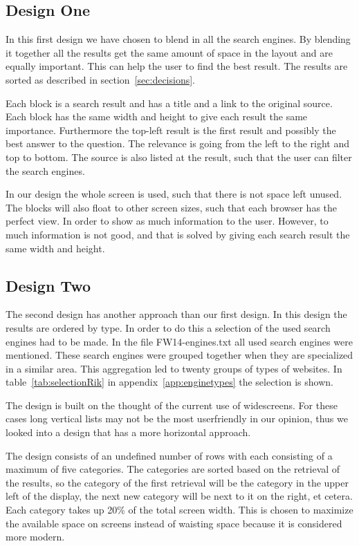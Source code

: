 \documentclass[12pt]{article}
\begin{document}
\subsection{Design One}
\label{sec:layoutHan}
In this first design we have chosen to blend in all the search engines. By blending it together all the results get the same amount of space in the layout and are equally important. This can help the user to find the best result. The results are sorted as described in section~\ref{sec:decisions}. 

Each block is a search result and has a title and a link to the original source. Each block has the same width and height to give each result the same importance. Furthermore the top-left result is the first result and possibly the best answer to the question. The relevance is going from the left to the right and top to bottom. The source is also listed at the result, such that the user can filter the search engines. 

In our design the whole screen is used, such that there is not space left unused. The blocks will also float to other screen sizes, such that each browser has the perfect view. In order to show as much information to the user. However, to much information is not good, and that is solved by giving each search result the same width and height. 

\subsection{Design Two}
\label{sec:layoutRik}
The second design has another approach than our first design.
In this design the results are ordered by type.
In order to do this a selection of the used search engines had to be made.
In the file FW14-engines.txt all used search engines were mentioned.
These search engines were grouped together when they are specialized in a similar area.
This aggregation led to twenty groups of types of websites.
In table~\ref{tab:selectionRik} in appendix~\ref{app:enginetypes} the selection is shown.

The design is built on the thought of the current use of widescreens.
For these cases long vertical lists may not be the most userfriendly in our opinion, thus we looked into a design that has a more horizontal approach.

The design consists of an undefined number of rows with each consisting of a maximum of five categories.
The categories are sorted based on the retrieval of the results, so the category of the first retrieval will be the category in the upper left of the display, the next new category will be next to it on the right, et cetera.
Each category takes up 20\% of the total screen width.
This is chosen to maximize the available space on screens instead of waisting space because it is considered more modern.
\end{document}
